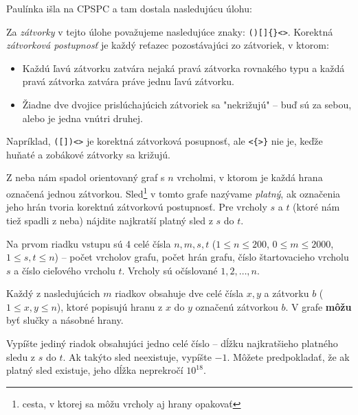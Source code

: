 
\usepackage[slovak]{babel}








Paulínka išla na CPSPC a tam dostala nasledujúcu úlohu:


Za \emph{zátvorky} v tejto úlohe považujeme nasledujúce znaky: \texttt{()[]\{\}<>}. Korektná \emph{zátvorková postupnosť} je každý reťazec pozostávajúci zo zátvoriek, v ktorom:
\begin{itemize}
 \item Každú ľavú zátvorku zatvára nejaká pravá zátvorka rovnakého typu a každá pravá zátvorka zatvára práve jednu ľavú zátvorku.
 \item Žiadne dve dvojice prislúchajúcich zátvoriek sa "nekrižujú" -- buď sú za sebou, alebo je jedna vnútri druhej.
\end{itemize}
Napríklad, \texttt{([])<>} je korektná zátvorková posupnosť, ale \texttt{<\{>\}} nie je, keďže huňaté a zobákové zátvorky sa križujú.

Z neba nám spadol orientovaný graf s $n$ vrcholmi, v ktorom je každá hrana označená jednou zátvorkou. Sled\footnote{cesta, v ktorej sa môžu vrcholy aj hrany opakovať} v tomto grafe nazývame \emph{platný}, ak
označenia jeho hrán tvoria korektnú zátvorkovú postupnosť. Pre vrcholy $s$ a $t$ (ktoré nám tiež spadli
z neba) nájdite najkratší platný sled z $s$ do $t$.


Na prvom riadku vstupu sú 4 celé čísla $n, m, s, t$ ($1 \leq n \leq 200$, $0 \leq m \leq 2000$, $1 \leq s, t \leq n$) -- počet vrcholov grafu, počet hrán grafu, číslo štartovacieho vrcholu $s$ a číslo cieľového vrcholu $t$. Vrcholy sú očíslované $1, 2, \dots, n$.

Každý z nasledujúcich $m$ riadkov obsahuje dve celé čísla $x, y$ a zátvorku $b$ ($1 \leq x, y \leq n$), ktoré popisujú hranu z $x$ do $y$ označenú zátvorkou $b$. V grafe \textbf{môžu} byť slučky a násobné hrany.


Vypíšte jediný riadok obsahujúci jedno celé číslo -- dĺžku najkratšieho platného sledu z $s$ do $t$. Ak
takýto sled neexistuje, vypíšte $-1$. Môžete predpokladať, že ak platný sled existuje, jeho dĺžka neprekročí $10^{18}$.

